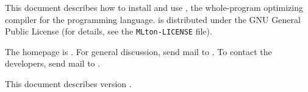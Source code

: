 This document describes how to install and use {\mlton}, the
whole-program optimizing compiler for the
programming language.  {\mlton} is distributed under the GNU General
Public License (for details, see the {\tt MLton-LICENSE} file).

The {\mlton} homepage is \absolutelink{}.  For general {\mlton}
discussion, send mail to {\mltonUserMail}.  To contact the {\mlton}
developers, send mail to {\mltonmail}.

This document describes {\mlton} version {\version}.

